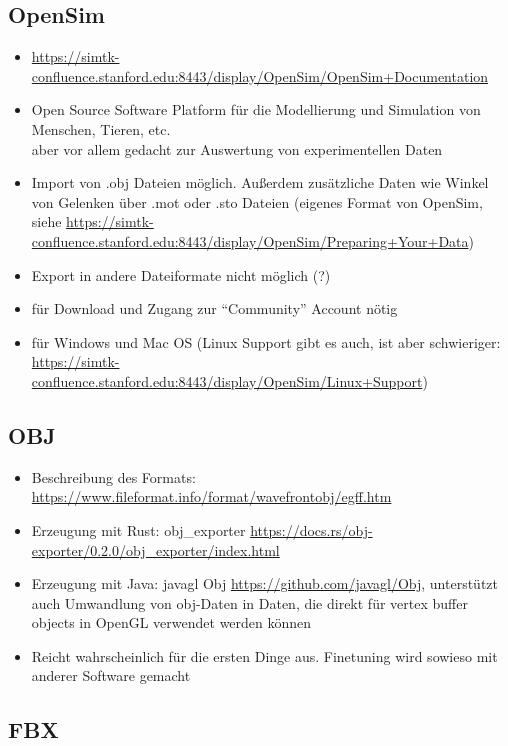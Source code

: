 \subsection{OpenSim}

\begin{itemize}
 \item \url{https://simtk-confluence.stanford.edu:8443/display/OpenSim/OpenSim+Documentation}
 \item Open Source Software Platform für die Modellierung und Simulation von Menschen, Tieren, etc.\\
 aber vor allem gedacht zur Auswertung von experimentellen Daten
 \item Import von .obj Dateien möglich. Außerdem zusätzliche Daten wie Winkel von Gelenken über .mot oder .sto Dateien (eigenes Format von OpenSim, siehe \url{https://simtk-confluence.stanford.edu:8443/display/OpenSim/Preparing+Your+Data})
 \item Export in andere Dateiformate nicht möglich (?)
 \item für Download und Zugang zur "`Community"' Account nötig
 \item für Windows und Mac OS (Linux Support gibt es auch, ist aber schwieriger: \url{https://simtk-confluence.stanford.edu:8443/display/OpenSim/Linux+Support})
\end{itemize}


\subsection{OBJ}

\begin{itemize}
 \item Beschreibung des Formats: \url{https://www.fileformat.info/format/wavefrontobj/egff.htm}
 \item Erzeugung mit Rust: obj\_exporter \url{https://docs.rs/obj-exporter/0.2.0/obj_exporter/index.html}
 \item Erzeugung mit Java: javagl Obj \url{https://github.com/javagl/Obj}, unterstützt auch Umwandlung von obj-Daten in Daten, die direkt für vertex buffer objects in OpenGL verwendet werden können
 \item Reicht wahrscheinlich für die ersten Dinge aus. Finetuning wird sowieso mit anderer Software gemacht
\end{itemize}

\subsection{FBX}

